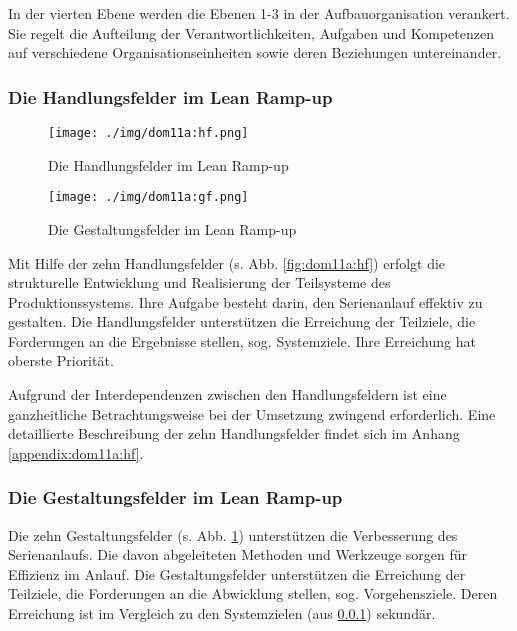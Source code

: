 In der vierten Ebene werden die Ebenen 1-3 in der Aufbauorganisation verankert. Sie regelt die Aufteilung der Verantwortlichkeiten, Aufgaben und Kompetenzen auf verschiedene Organisationseinheiten sowie deren Beziehungen untereinander. 
\subsubsection{Die Handlungsfelder im Lean Ramp-up}\label{sec:dom11a:hf}
\begin{figure}[!ht] 
    \begin{minipage}{0.45\linewidth} 
    \begin{center}
 \texttt{[image: ./img/dom11a:hf.png]}
 \caption[Die Handlungsfelder im Lean Ramp-up]{Die Handlungsfelder im Lean Ramp-up \cite{Dombrowski2011a}}\label{fig:dom11a:hf}
\end{center}
    \end{minipage} 
    \hfill 
    \begin{minipage}{0.5\linewidth} 
 \texttt{[image: ./img/dom11a:gf.png]}
 \caption[Die Gestaltungsfelder im Lean Ramp-up]{Die Gestaltungsfelder im Lean Ramp-up\cite{Dombrowski2011a}}\label{fig:dom11a:gf}
    \end{minipage} 
  \end{figure} 

Mit Hilfe der zehn Handlungsfelder (s. Abb. \ref{fig:dom11a:hf}) erfolgt die strukturelle Entwicklung und Realisierung der Teilsysteme des Produktionssystems. Ihre Aufgabe besteht darin, den Serienanlauf effektiv zu gestalten. Die Handlungsfelder unterstützen die Erreichung der Teilziele, die Forderungen an die Ergebnisse stellen, sog. Systemziele. Ihre Erreichung hat oberste Priorität. 

Aufgrund der Interdependenzen zwischen den Handlungsfeldern ist eine ganzheitliche Betrachtungsweise bei der Umsetzung zwingend erforderlich. 
Eine detaillierte Beschreibung der zehn Handlungsfelder findet sich im Anhang \ref{appendix:dom11a:hf}. 

  
\subsubsection{Die Gestaltungsfelder im Lean Ramp-up}\label{sec:dom11a:gf}
Die zehn Gestaltungsfelder (s. Abb. \ref{fig:dom11a:gf}) unterstützen die Verbesserung des Serienanlaufs. Die davon abgeleiteten Methoden und Werkzeuge sorgen für Effizienz im Anlauf. Die Gestaltungsfelder unterstützen die Erreichung der Teilziele, die Forderungen an die Abwicklung stellen, sog. Vorgehensziele. Deren Erreichung ist im Vergleich zu den Systemzielen (aus \ref{sec:dom11a:hf}) sekundär. 

